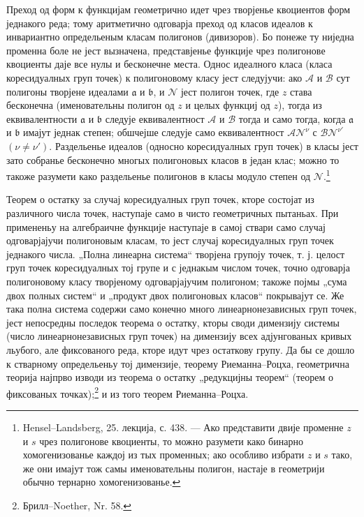 ﻿\documentclass[11pt]{article}
\providecommand{\fra}{\mathfrak a}
\providecommand{\frb}{\mathfrak b}
\providecommand{\calA}{\mathcal A}
\providecommand{\calB}{\mathcal B}
\providecommand{\calN}{\mathcal N}
\begin{document}
Преход од форм к функцијам геометрично идет чрез творјенье квоциентов форм једнакого реда; тому аритметично одговарја преход од класов идеалов к инвариантно определьеным класам полигонов (дивизоров). Бо понеже ту ниједна променна боле не јест вызначена, представјенье функције чрез полигонове квоциенты даје все нулы и бесконечне места. Однос идеалного класа (класа коресидуалных груп точек) к полигоновому класу јест следујучи: ако \(\calA\) и \(\calB\) сут полигоны творјене идеалами \(\fra\) и \(\frb\), и \(\calN\) јест полигон точек, где \(z\) става бесконечна (именовательны полигон од \(z\) и целых функциј од \(z\)), тогда из еквивалентности \(\fra\) и \(\frb\) следује еквивалентност \(\calA\) и \(\calB\) тогда и само тогда, когда \(\fra\) и \(\frb\) имајут једнак степен; обшчејше следује само еквивалентност \(\calA\calN^\nu\) с \(\calB\calN^{\nu'}\) \((\nu\ne\nu')\). Раздельенье идеалов (односно коресидуалных груп точек) в класы јест зато собранье бесконечно многых полигоновых класов в један клас; можно то такоже разумети како раздельенье полигонов в класы модуло степен од \(\calN\).\footnote{Hensel--Landsberg, 25. лекција, с. 438. --- Ако представити двије променне \(z\) и \(s\) чрез полигонове квоциенты, то можно разумети како бинарно хомогенизованье каждој из тых променных; ако особливо избрати \(z\) и \(s\) тако, же они имајут тож самы именовательны полигон, настаје в геометрији обычно тернарно хомогенизованье.}

Теорем о остатку за случај коресидуалных груп точек, кторе состојат из различного числа точек, наступаје само в чисто геометричных пытаньах. При примененьу на алгебраичне функције наступаје в самој ствари само случај одговарјајучи полигоновым класам, то јест случај коресидуалных груп точек једнакого числа. „Полна линеарна система“ творјена групоју точек, т. ј. целост груп точек коресидуалных тој групе и с једнакым числом точек, точно одговарја полигоновому класу творјеному одговарјајучим полигоном; такоже појмы „сума двох полных систем“ и „продукт двох полигоновых класов“ покрывајут се. Же така полна система содержи само конечно много линеарнонезависных груп точек, јест непосредны последок теорема о остатку, кторы своди димензију системы (число линеарнонезависных груп точек) на димензију всех адјунгованых кривых льубого, але фиксованого реда, кторе идут чрез остаткову групу. Да бы се дошло к стварному определьеньу тој димензије, теорему Риеманна--Роцха, геометрична теорија најпрво изводи из теорема о остатку „редукцијны теорем“ (теорем о фиксованых точках);\footnote{Брилл--Noether, Nr. 58.} и из того теорем Риеманна--Роцха.
\end{document}
